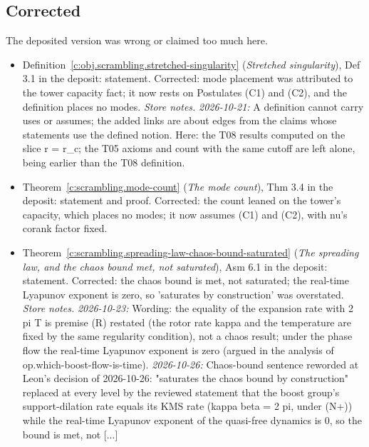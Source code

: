 \documentclass[11pt]{article}
\theoremstyle{definition}
\theoremstyle{plain}
\begin{document}
\subsection*{Corrected}
The deposited version was wrong or claimed too much here.
\begin{itemize}\setlength{\itemsep}{2pt}
\item Definition~\ref{c:obj.scrambling.stretched-singularity} (\emph{Stretched singularity}), Def 3.1 in the deposit: statement. Corrected: mode placement was attributed to the tower capacity fact; it now rests on Postulates (C1) and (C2), and the definition places no modes. \emph{Store notes.} \emph{2026-10-21:} A definition cannot carry uses or assumes; the added links are about edges from the claims whose statements use the defined notion. Here: the T08 results computed on the slice r = r\_c; the T05 axioms and count with the same cutoff are left alone, being earlier than the T08 definition.
\item Theorem~\ref{c:scrambling.mode-count} (\emph{The mode count}), Thm 3.4 in the deposit: statement and proof. Corrected: the count leaned on the tower's capacity, which places no modes; it now assumes (C1) and (C2), with nu's corank factor fixed.
\item Theorem~\ref{c:scrambling.spreading-law-chaos-bound-saturated} (\emph{The spreading law, and the chaos bound met, not saturated}), Asm 6.1 in the deposit: statement. Corrected: the chaos bound is met, not saturated; the real-time Lyapunov exponent is zero, so 'saturates by construction' was overstated. \emph{Store notes.} \emph{2026-10-23:} Wording: the equality of the expansion rate with 2 pi T is premise (R) restated (the rotor rate kappa and the temperature are fixed by the same regularity condition), not a chaos result; under the phase flow the real-time Lyapunov exponent is zero (argued in the analysis of op.which-boost-flow-is-time). \emph{2026-10-26:} Chaos-bound sentence reworded at Leon's decision of 2026-10-26: "saturates the chaos bound by construction" replaced at every level by the reviewed statement that the boost group's support-dilation rate equals its KMS rate (kappa beta = 2 pi, under (N+)) while the real-time Lyapunov exponent of the quasi-free dynamics is 0, so the bound is met, not [...]
\end{itemize}
\end{document}
